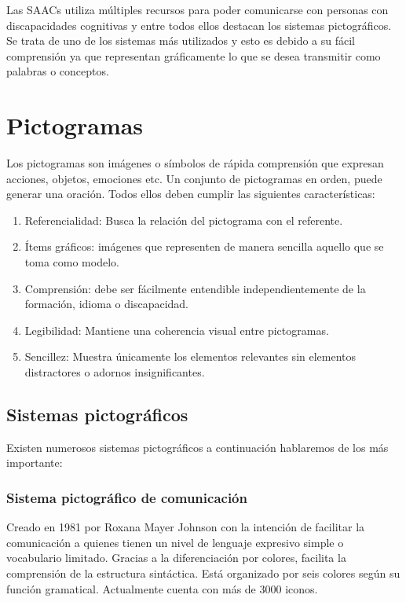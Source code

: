 Las SAACs utiliza múltiples recursos para poder comunicarse con personas con discapacidades cognitivas y entre todos ellos destacan los sistemas pictográficos. Se trata de uno de los sistemas más utilizados y esto es debido a su fácil comprensión ya que representan gráficamente lo que se desea transmitir como palabras o conceptos. 

\section{Pictogramas}
Los pictogramas son imágenes o símbolos de rápida comprensión que expresan acciones, objetos, emociones etc. Un conjunto de pictogramas en orden, puede generar una oración. Todos ellos deben cumplir las siguientes características:
\begin{enumerate}
	\item Referencialidad: Busca la relación del pictograma con el referente.
	\item Ítems gráficos: imágenes que representen de manera sencilla aquello que se toma como modelo.
	\item Comprensión: debe ser fácilmente entendible independientemente de la formación, idioma o discapacidad.
	\item Legibilidad: Mantiene una coherencia visual entre pictogramas.
	\item Sencillez: Muestra únicamente los elementos relevantes sin elementos distractores o adornos insignificantes.
\end{enumerate}

\subsection{Sistemas pictográficos}
Existen numerosos sistemas pictográficos a continuación hablaremos de los más importante:

\subsubsection{Sistema pictográfico de comunicación}

Creado en 1981 por Roxana Mayer Johnson con la intención de facilitar la comunicación a quienes tienen un nivel de lenguaje expresivo simple o vocabulario limitado. Gracias a la diferenciación por colores, facilita la comprensión de la estructura sintáctica. Está organizado por seis colores según su función gramatical. Actualmente cuenta con más de 3000 iconos.

